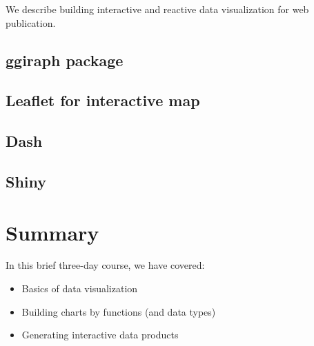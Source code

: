 \documentclass[
]{book}
\providecommand{\tightlist}{%
  \setlength{\itemsep}{0pt}\setlength{\parskip}{0pt}}
\begin{document}
We describe building interactive and reactive data visualization for web publication.

\hypertarget{ggiraph-package}{%
\section{ggiraph package}\label{ggiraph-package}}

\hypertarget{leaflet-for-interactive-map}{%
\section{Leaflet for interactive map}\label{leaflet-for-interactive-map}}

\hypertarget{dash}{%
\section{Dash}\label{dash}}

\hypertarget{shiny}{%
\section{Shiny}\label{shiny}}

\hypertarget{summary}{%
\chapter{Summary}\label{summary}}

In this brief three-day course, we have covered:

\begin{itemize}
\tightlist
\item
  Basics of data visualization
\item
  Building charts by functions (and data types)
\item
  Generating interactive data products
\end{itemize}

  
\end{document}

